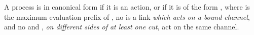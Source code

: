 \begin{definition}\label{def:nc-canonical-forms}
  A process  is in canonical form if it is an action, or if it is of the
  form , where  is the maximum evaluation
  prefix of , no  is a link \emph{which acts on a bound channel},
  and no  and , \emph{on different sides of at least one cut}, act on
  the same channel.
\end{definition}
